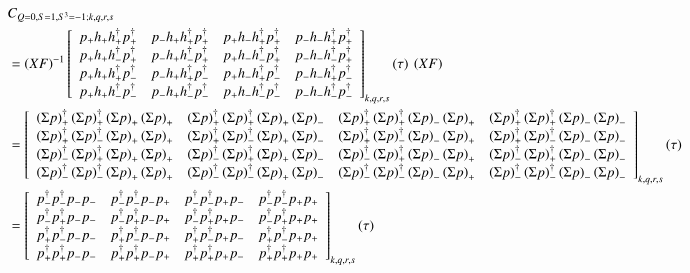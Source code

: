 \begin{equation}
  \begin{aligned}
    &C_{Q=0,S=1,S^3=-1;k,q,r,s} \\
    &=\left(XF\right)^{-1} \left[ 
    {\begin{array}{cccc}
      \cor{+}{+}{+}{+} & \cor{+}{+}{+}{-} & \cor{+}{+}{-}{+} & \cor{+}{+}{-}{-} \\
      \cor{+}{-}{+}{+} & \cor{+}{-}{+}{-} & \cor{+}{-}{-}{+} & \cor{+}{-}{-}{-} \\
      \cor{-}{+}{+}{+} & \cor{-}{+}{+}{-} & \cor{-}{+}{-}{+} & \cor{-}{+}{-}{-} \\
      \cor{-}{-}{+}{+} & \cor{-}{-}{+}{-} & \cor{-}{-}{-}{+} & \cor{-}{-}{-}{-} \\
    \end{array}}
    \right]_{k,q,r,s} (\tau)\:\left(XF\right) \\
    &= \left[ 
    {\begin{array}{cccc}
      \dscor{+}{+}{+}{+} & \dscor{+}{+}{+}{-} & \dscor{+}{+}{-}{+} & \dscor{+}{+}{-}{-} \\
      \dscor{+}{-}{+}{+} & \dscor{+}{-}{+}{-} & \dscor{+}{-}{-}{+} & \dscor{+}{-}{-}{-} \\
      \dscor{-}{+}{+}{+} & \dscor{-}{+}{+}{-} & \dscor{-}{+}{-}{+} & \dscor{-}{+}{-}{-} \\
      \dscor{-}{-}{+}{+} & \dscor{-}{-}{+}{-} & \dscor{-}{-}{-}{+} & \dscor{-}{-}{-}{-} \\
    \end{array}}
    \right]_{k,q,r,s} (\tau) \\
    &= \left[ 
    {\begin{array}{cccc}
      \dcor{-}{-}{-}{-} & \dcor{-}{-}{-}{+} & \dcor{-}{-}{+}{-} & \dcor{-}{-}{+}{+} \\
      \dcor{-}{+}{-}{-} & \dcor{-}{+}{-}{+} & \dcor{-}{+}{+}{-} & \dcor{-}{+}{+}{+} \\
      \dcor{+}{-}{-}{-} & \dcor{+}{-}{-}{+} & \dcor{+}{-}{+}{-} & \dcor{+}{-}{+}{+} \\
      \dcor{+}{+}{-}{-} & \dcor{+}{+}{-}{+} & \dcor{+}{+}{+}{-} & \dcor{+}{+}{+}{+} \\
    \end{array} } \right]_{k,q,r,s} (\tau) \\
  \end{aligned}
\end{equation}
  \renewcommand{\cor}[4]{p_{#4}h_{#3}h^\dagger_{#2}p^\dagger_{#1}}
